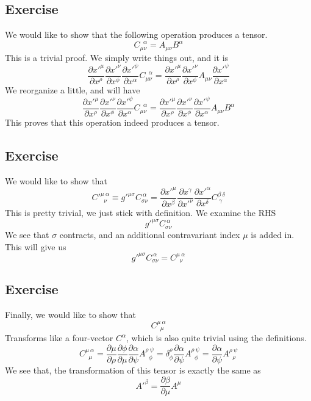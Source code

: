 \documentclass[12pt]{memoir}
\newcommand{\pypx}[2]{\frac{\partial #1}{\partial #2}}
\begin{document}
    \subsection{Exercise}
    We would like to show that the following operation produces a tensor.
    \[
    C_{\mu \nu}^{\;\; \alpha} = A_{\mu \nu} B^{\alpha}
    \]
    This is a trivial proof. We simply write things out, and it is
    \[
    \pypx{x'^\mu}{x^\rho}\pypx{x'^\nu}{x^\phi}\pypx{x'^{\psi}}{x^{\alpha}}C_{\mu\nu}^{\;\;\alpha} =  \pypx{x'^\mu}{x^\rho}\pypx{x'^\nu}{x^\phi}A_{\mu\nu}\pypx{x'^{\psi}}{x^{\alpha}}
    \]
    We reorganize a little, and will have
    \[
     \pypx{x'^\mu}{x^\rho}\pypx{x'^\nu}{x^\phi}\pypx{x'^{\psi}}{x^{\alpha}}C_{\mu\nu}^{\;\;\alpha} =  \pypx{x'^\mu}{x^\rho}\pypx{x'^\nu}{x^\phi}\pypx{x'^{\psi}}{x^{\alpha}}A_{\mu\nu}B^{\alpha}
    \]
    This proves that this operation indeed produces a tensor. 

    \subsection{Exercise}
    We would like to show that
    \[
    C'^{\mu \ \alpha}_{\;\;\nu} \equiv g'^{\mu \sigma} C_{\sigma \nu}^{\ \alpha} = \frac{\partial x'^{\mu}}{\partial x^{\beta}} \frac{\partial x^{\gamma}}{\partial x'^{\nu}} \frac{\partial x'^{\alpha}}{\partial x^{\delta}} C^{\beta \ \delta}_{\ \gamma}
    \]
    This is pretty trivial, we just stick with definition. We examine the RHS
    \[
    g'^{\mu \sigma} C_{\sigma \nu}^{\ \alpha}
    \]
    We see that $\sigma$ contracts, and an additional contravariant index $\mu$ is added in. This will give us
    \[
    g'^{\mu \sigma} C_{\sigma \nu}^{\ \alpha} = C^{\mu\ \alpha}_{\;\;\nu}
    \]

    \subsection{Exercise}
    Finally, we would like to show that
    \[
    C^{\mu \ \alpha}_{\;\;\mu} 
    \]
    Transforms like a four-vector $C^\alpha$, which is also quite trivial using the definitions. 
    \[
    C^{\mu \ \alpha}_{\;\;\mu}  = \pypx{\mu}{\rho}\pypx{\phi}{\mu}\pypx{\alpha}{\psi} A^{\rho \ \psi}_{\;\;\phi} = \delta^{\rho}_{\phi} \pypx{\alpha}{\psi} A^{\rho \ \psi}_{\;\;\phi} = \pypx{\alpha}{\psi} A^{\rho \ \psi}_{\;\;\rho}
    \]
    We see that, the transformation of this tensor is exactly the same as
    \[
    A'^{\beta} = \pypx{\beta}{\mu}A^{\mu}
    \]

    
    
    

    
    
    
\end{document}
